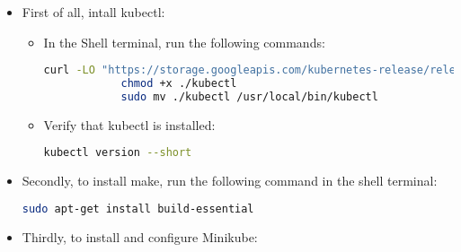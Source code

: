 \begin{itemize}
	\item First of all, intall kubectl:

	\begin{itemize}
		\item In the Shell terminal, run the following commands:	
		\begin{lstlisting}[language=bash]
			curl -LO "https://storage.googleapis.com/kubernetes-release/release/$(curl -s https://storage.googleapis.com/kubernetes-release/release/stable.txt)/bin/linux/amd64/kubectl"
			chmod +x ./kubectl
			sudo mv ./kubectl /usr/local/bin/kubectl
		\end{lstlisting}

		\item Verify that kubectl is installed:
		\begin{lstlisting}[language=bash]
			kubectl version --short
		\end{lstlisting}
	\end{itemize}

	\item Secondly, to install make, run the following command in the shell terminal:
	\begin{lstlisting}[language=bash]
		sudo apt-get install build-essential
	\end{lstlisting}

	\item Thirdly, to install and configure Minikube:


\end{itemize}
